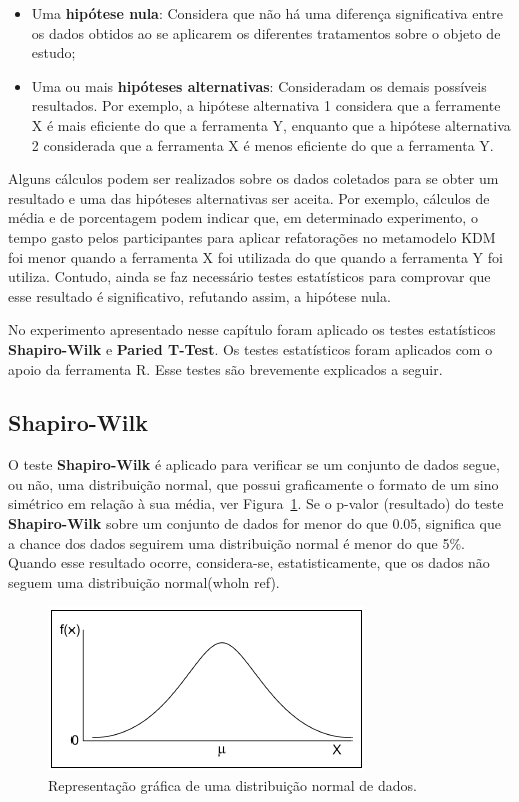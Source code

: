 \begin{itemize}
\item Uma \textbf{hipótese nula}: Considera que não há uma diferença significativa entre os dados obtidos ao se aplicarem os diferentes tratamentos sobre o objeto de estudo;
\item Uma ou mais \textbf{hipóteses alternativas}: Consideradam os demais possíveis resultados. Por exemplo, a hipótese alternativa 1 considera que a ferramente X é mais eficiente do que a ferramenta Y, enquanto que a hipótese alternativa 2 considerada que a ferramenta X é menos eficiente do que a ferramenta Y.
\end{itemize}

Alguns cálculos podem ser realizados sobre os dados coletados para se obter um resultado e uma das hipóteses alternativas ser aceita. Por exemplo, cálculos de média e de porcentagem podem indicar que, em determinado experimento, o tempo gasto pelos participantes para aplicar refatorações no metamodelo KDM foi menor quando a ferramenta X foi utilizada do que quando a ferramenta Y foi utiliza. Contudo, ainda se faz necessário testes estatísticos para comprovar que esse resultado é significativo, refutando assim, a hipótese nula.

No experimento apresentado nesse capítulo foram aplicado os testes estatísticos \textbf{Shapiro-Wilk} e \textbf{Paried T-Test}. Os testes estatísticos foram aplicados com o apoio da ferramenta R. Esse testes são brevemente explicados a seguir.

\subsection{Shapiro-Wilk}

O teste \textbf{Shapiro-Wilk} é aplicado para verificar se um conjunto de dados segue, ou não, uma distribuição normal, que possui graficamente o formato de um sino simétrico em relação à sua média, ver Figura~\ref{fig:shapiro_wilk}. Se o p-valor (resultado) do teste \textbf{Shapiro-Wilk} sobre um conjunto de dados for menor do que 0.05, significa que a chance dos dados seguirem uma distribuição normal é menor do que 5\%. Quando esse resultado ocorre, considera-se, estatisticamente, que os dados não seguem uma distribuição normal(wholn ref). 

\begin{figure}[h]
	\centering
	\caption{Representação gráfica de uma distribuição normal de dados.}
	\label{fig:shapiro_wilk}
	\includegraphics[scale=0.9]{images/distribuicao_normal}
	\fautor
\end{figure}

